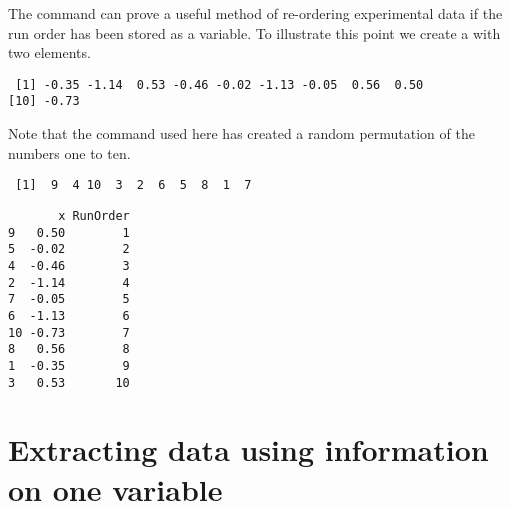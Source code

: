 The  command can prove a useful method of re-ordering experimental data if the run order has been stored as a variable. To illustrate this point we create a  with two elements. 
\begin{knitrout}
\color{fgcolor}\begin{kframe}
\begin{alltt}
\hlstd{> }\hlkwb{=}\hlstd{(}\hlstd{(}\hlstd{),}\hlstd{)}
\hlstd{> }
\end{alltt}
\begin{verbatim}
 [1] -0.35 -1.14  0.53 -0.46 -0.02 -1.13 -0.05  0.56  0.50
[10] -0.73
\end{verbatim}
\begin{alltt}
\hlstd{> }\hlkwb{=}\hlstd{(}\hlstd{)}
\end{alltt}
\end{kframe}
\end{knitrout}
 
Note that the  command used here has created a random permutation of the numbers one to ten. 
\begin{knitrout}
\color{fgcolor}\begin{kframe}
\begin{alltt}
\hlstd{> }
\end{alltt}
\begin{verbatim}
 [1]  9  4 10  3  2  6  5  8  1  7
\end{verbatim}
\begin{alltt}
\hlstd{> }\hlkwb{=}
\hlstd{> }\hlstd{Data[}\hlstd{(RunOrder),]}
\end{alltt}
\begin{verbatim}
       x RunOrder
9   0.50        1
5  -0.02        2
4  -0.46        3
2  -1.14        4
7  -0.05        5
6  -1.13        6
10 -0.73        7
8   0.56        8
1  -0.35        9
3   0.53       10
\end{verbatim}
\end{kframe}
\end{knitrout}
 
\section{Extracting data using information on one variable} 
 
